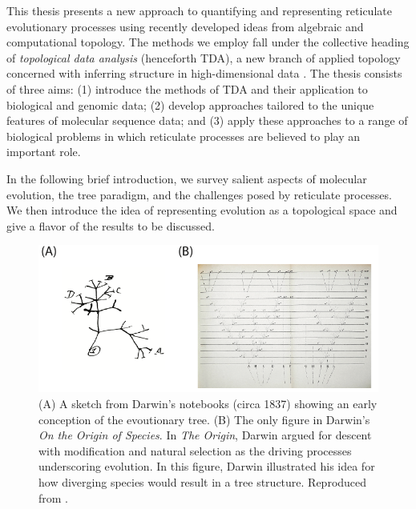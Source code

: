 This thesis presents a new approach to quantifying and representing reticulate evolutionary processes using recently developed ideas from algebraic and computational topology.
The methods we employ fall under the collective heading of \emph{topological data analysis} (henceforth TDA), a new branch of applied topology concerned with inferring structure in high-dimensional data \cite{Carlsson:2014cn}.
The thesis consists of three aims: (1) introduce the methods of TDA and their application to biological and genomic data; (2) develop approaches tailored to the unique features of molecular sequence data; and (3) apply these approaches to a range of biological problems in which reticulate processes are believed to play an important role.

In the following brief introduction, we survey salient aspects of molecular evolution, the tree paradigm, and the challenges posed by reticulate processes.
We then introduce the idea of representing evolution as a topological space and give a flavor of the results to be discussed.


\begin{figure}
\centering
\includegraphics[]{./fig/introduction/darwin3.pdf}
\caption[Charles Darwin and the Evolutionary Tree]{(A) A sketch from Darwin's notebooks (circa 1837) showing an early conception of the evoutionary tree. (B) The only figure in Darwin's \emph{On the Origin of Species}. In \emph{The Origin}, Darwin argued for descent with modification and natural selection as the driving processes underscoring evolution. In this figure, Darwin illustrated his idea for how diverging species would result in a tree structure. Reproduced from \cite{Darwin:1859uh}.}
\label{fig:darwin_origin}
\end{figure}

